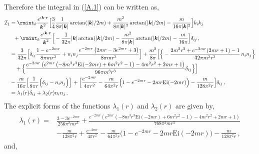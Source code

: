 Therefore the integral in (\ref{A.1}) can be written as,
\begin{align}
    \begin{split}
    \mathcal{I}_{1}&=\rmint_{k}\frac{e^{i\boldsymbol{k}\cdot\boldsymbol{r}}}{\boldsymbol{k}^2}\Big[\frac{3}{4}\frac{1}{8\pi|\boldsymbol{k}|}\arctan(|\boldsymbol{k}|/2m)+\frac{m^2}{8\pi|\boldsymbol{k}|^3}\arctan(|\boldsymbol{k}|/2m)-\frac{m}{16\pi|\boldsymbol{k}|^2}\Big]k_ik_j\\ &
   \,\,\,\, +\rmint_{k}\frac{e^{i\boldsymbol{k}\cdot \boldsymbol{r}}}{\boldsymbol{k}^2}\Big[-\frac{1}{32\pi}|\boldsymbol{k}|\arctan(|\boldsymbol{k}|/2m)-\frac{m^2}{8\pi |\boldsymbol{k}|}\arctan(|\boldsymbol{k}|/2m)-\frac{m}{16\pi}\Big]\delta_{ij}\,,
   \\ & =\frac{3}{32\pi}\Big[\delta_{ij}\frac{1-e^{-2 m r}}{8 \pi  m r^3}+n_in_j\frac{e^{-2m r} \left(2m r-3 e^{2m r}+3\right)}{8 \pi  m r^3}\Big]+\frac{m^2}{8\pi}\Big[\Big\{-\frac{2 m^2 r^2+e^{-2 m r} (2 m r+1)-1}{32 \pi  m^3 r^3}\,n_in_j\Big\}\\ &
  \,\,\,\,\,\, +\Big\{\frac{e^{-2 m r} \left(e^{2 m r} \left(-8 m^3 r^3 \text{Ei}(-2 m r)+6 m^2 r^2-1\right)-4 m^2 r^2+2 m r+1\right)}{96 \pi  m^3 r^3}\delta_{ij}\Big\}\Big]
   \\&-\frac{m}{16\pi}\Big[\frac{1}{8\pi r}\Big(\delta_{ij}-n_i n_j\Big)\Big]
  \,
  +\Big[\frac{e^{-2mr}}{4\pi r^2}-\frac{m}{64 \pi^2 r}\Big(1-e^{-2mr}-2mr \text{Ei}(-2mr)\Big)-\frac{m}{128\pi^2 r}\Big]\delta_{ij}\,,\\ &
   =\lambda_1(r)\delta_{ij}+\lambda_2(r)n_i n_j\,.
    \end{split}\label{B.5m}
\end{align}
The explicit forms of the functions $\lambda_1(r)$ and $\lambda_2(r)$ are given by,
\begin{align}
    \begin{split}
        \lambda_1(r)=&\frac{3-3e^{-2mr}}{256\pi^2m r^3}+\frac{e^{-2 m r} \left(e^{2 m r} \left(-8 m^3 r^3 \text{Ei}(-2 m r)+6 m^2 r^2-1\right)-4 m^2 r^2+2 m r+1\right)}{768\pi^2m r^3}\\ &
        -\frac{m}{128\pi^2 r}+\frac{e^{-2mr}}{4\pi r^2}-\frac{m}{64 \pi^2 r}\Big(1-e^{-2mr}-2mr \text{Ei}(-2mr)\Big)-\frac{m}{128\pi^2 r}\,,
    \end{split}
\end{align}
and,

